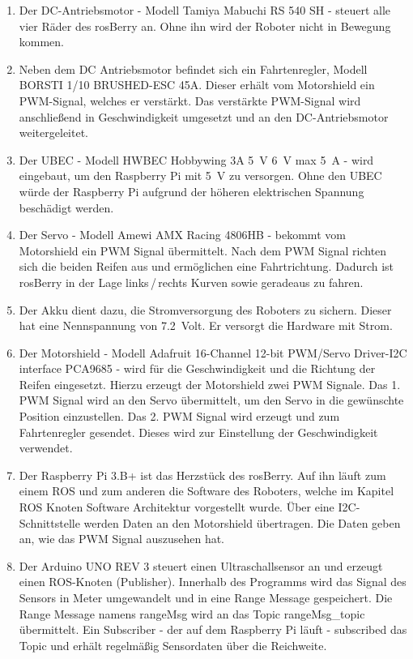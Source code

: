 \documentclass[conference]{IEEEtran}
\begin{document}
	\begin{enumerate}
		\item Der DC-Antriebsmotor - Modell Tamiya Mabuchi RS 540 SH - steuert alle vier Räder des rosBerry an.
		Ohne ihn wird der Roboter nicht in Bewegung kommen.
		\item Neben dem DC Antriebsmotor befindet sich ein Fahrtenregler, Modell BORSTI 1/10 BRUSHED-ESC 45A.
		Dieser erhält vom Motorshield ein PWM-Signal, welches er verstärkt.
		Das verstärkte PWM-Signal wird anschließend in Geschwindigkeit umgesetzt und an den DC-Antriebsmotor weitergeleitet.
		\item Der UBEC - Modell HWBEC Hobbywing 3A \SI{5}{V} \SI{6}{V} max \SI{5}{A} - wird eingebaut, um den Raspberry Pi mit \SI{5}{V} zu versorgen.
		Ohne den UBEC würde der Raspberry Pi aufgrund der höheren elektrischen Spannung beschädigt werden.
		\item Der Servo - Modell Amewi AMX Racing 4806HB - bekommt vom Motorshield ein PWM Signal übermittelt.
		Nach dem PWM Signal richten sich die beiden Reifen aus und ermöglichen eine Fahrtrichtung.
		Dadurch ist rosBerry in der Lage links\,/\,rechts Kurven sowie geradeaus zu fahren.
		\item Der Akku dient dazu, die Stromversorgung des Roboters zu sichern.
		Dieser hat eine Nennspannung von \SI{7,2}{Volt}. Er versorgt die Hardware mit Strom.
		\item Der Motorshield - Modell Adafruit 16-Channel 12-bit PWM/Servo Driver-I2C interface PCA9685 - wird für die Geschwindigkeit und die Richtung der Reifen eingesetzt.
		Hierzu erzeugt der Motorshield zwei PWM Signale.
		Das 1. PWM Signal wird an den Servo übermittelt, um den Servo in die gewünschte Position einzustellen.
		Das 2. PWM Signal wird erzeugt und zum Fahrtenregler gesendet.
		Dieses wird zur Einstellung der Geschwindigkeit verwendet.
		\item Der Raspberry Pi 3.B+ ist das Herzstück des rosBerry.
		Auf ihn läuft zum einem ROS und zum anderen die Software des Roboters, welche im Kapitel ROS Knoten Software Architektur vorgestellt wurde.
		Über eine I2C-Schnittstelle werden Daten an den Motorshield übertragen.
		Die Daten geben an, wie das PWM Signal auszusehen hat.
		\item Der Arduino UNO REV 3 steuert einen Ultraschallsensor an und erzeugt einen ROS-Knoten (Publisher).
		Innerhalb des Programms wird das Signal des Sensors in Meter umgewandelt und in eine Range Message gespeichert.
		Die Range Message namens rangeMsg wird an das Topic rangeMsg\_topic übermittelt.
		Ein Subscriber - der auf dem Raspberry Pi läuft - subscribed das Topic und erhält regelmäßig Sensordaten über die Reichweite.
		

\end{enumerate}
\end{document}
